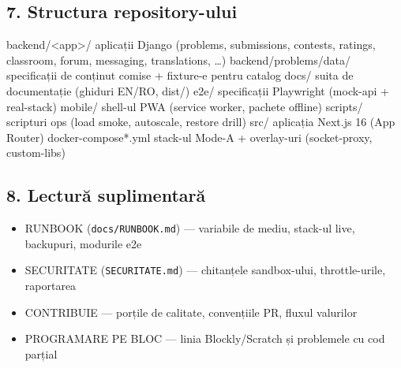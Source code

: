 \documentclass[
]{article}
\newenvironment{Shaded}{}{}
\newcommand{\NormalTok}[1]{#1}
\providecommand{\tightlist}{%
  \setlength{\itemsep}{0pt}\setlength{\parskip}{0pt}}
\begin{document}
\subsection{7. Structura
repository-ului}\label{7-structura-repository-ului}

\begin{Shaded}
\begin{Highlighting}[]
\NormalTok{backend/\textless{}app\textgreater{}/         aplicații Django (problems, submissions, contests, ratings,}
\NormalTok{                       classroom, forum, messaging, translations, …)}
\NormalTok{backend/problems/data/ specificații de conținut comise + fixture{-}e pentru catalog}
\NormalTok{docs/                  suita de documentație (ghiduri EN/RO, dist/)}
\NormalTok{e2e/                   specificații Playwright (mock{-}api + real{-}stack)}
\NormalTok{mobile/                shell{-}ul PWA (service worker, pachete offline)}
\NormalTok{scripts/               scripturi ops (load smoke, autoscale, restore drill)}
\NormalTok{src/                   aplicația Next.js 16 (App Router)}
\NormalTok{docker{-}compose*.yml    stack{-}ul Mode{-}A + overlay{-}uri (socket{-}proxy, custom{-}libs)}
\end{Highlighting}
\end{Shaded}

\subsection{8. Lectură
suplimentară}\label{8-lecturux103-suplimentarux103}

\begin{itemize}
\tightlist
\item
  RUNBOOK (\texttt{docs/RUNBOOK.md}) --- variabile de mediu, stack-ul
  live, backupuri, modurile e2e
\item
  SECURITATE (\texttt{SECURITATE.md}) --- chitanțele sandbox-ului,
  throttle-urile, raportarea
\item
  CONTRIBUIE --- porțile de calitate, convențiile PR, fluxul valurilor
\item
  PROGRAMARE PE BLOC --- linia Blockly/Scratch și problemele cu cod
  parțial
\end{itemize}
\end{document}
